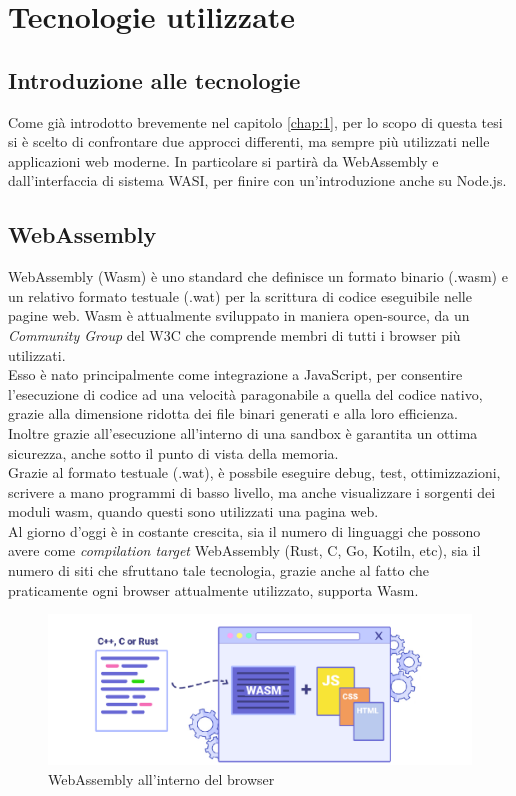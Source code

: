 \chapter{Tecnologie utilizzate}
\label{chap:2}

\section{Introduzione alle tecnologie}
\label{sec:IntroduzioneTecnologie}
Come già introdotto brevemente nel capitolo \ref{chap:1}, per lo scopo di questa tesi si è scelto di confrontare due approcci differenti, ma sempre più utilizzati nelle applicazioni web moderne.
In particolare si partirà da WebAssembly e dall'interfaccia di sistema WASI, per finire con un'introduzione anche su Node.js.

\section{WebAssembly}
\label{sec:Wasm}
WebAssembly (Wasm) è uno standard che definisce un formato binario (.wasm) e un relativo formato testuale (.wat) per la scrittura di codice eseguibile nelle pagine web. 
Wasm è attualmente sviluppato in maniera open-source, da un \emph{Community Group} del W3C che comprende membri di tutti i browser più utilizzati.
\\Esso è nato principalmente come integrazione a JavaScript, per consentire l'esecuzione di codice ad una velocità paragonabile a quella del codice nativo, grazie alla dimensione ridotta dei file binari generati e alla loro efficienza.
\\Inoltre grazie all'esecuzione all'interno di una sandbox è garantita un ottima sicurezza, anche sotto il punto di vista della memoria.
\\Grazie al formato testuale (.wat), è possbile eseguire debug, test, ottimizzazioni, scrivere a mano programmi di basso livello, ma anche visualizzare i sorgenti dei moduli wasm, quando questi sono utilizzati una pagina web.
\cite*{wasmDesign}
\\Al giorno d'oggi è in costante crescita, sia il numero di linguaggi che possono avere come \emph{compilation target} WebAssembly (Rust, C, Go, Kotiln, etc), sia il numero di siti che sfruttano tale tecnologia, grazie anche al fatto che praticamente ogni browser attualmente utilizzato, supporta Wasm. 
\begin{figure}
        \begin{center}
                \includegraphics[width=0.8\columnwidth]{images/wasm.png}
        \end{center}
        \caption{WebAssembly all'interno del browser}
        \label{fig:wasm}
\end{figure}
